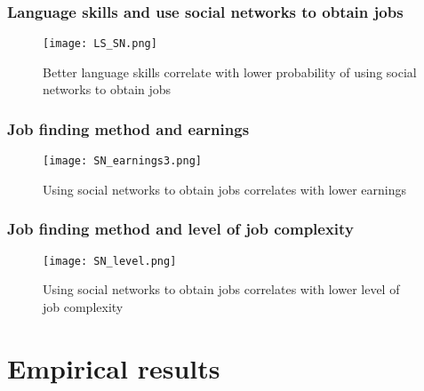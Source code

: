 \documentclass{beamer}
\begin{document}

\begin{frame}
\frametitle{Language skills and use social networks to obtain jobs}

\begin{figure}
\centering
\texttt{[image: LS\_SN.png]}
  \caption*{Better language skills correlate with lower probability of using social networks to obtain jobs}
\end{figure}

\end{frame}


\begin{frame}
\frametitle{Job finding method and earnings}

\begin{figure}
\centering
\texttt{[image: SN\_earnings3.png]}
  \caption*{Using social networks to obtain jobs correlates with lower earnings}
\end{figure}

\end{frame}


\begin{frame}
\frametitle{Job finding method and level of job complexity}

\begin{figure}
\centering
\texttt{[image: SN\_level.png]}
  \caption*{Using social networks to obtain jobs correlates with lower level of job complexity}
\end{figure}

\end{frame}
\section{Empirical results}
\end{document}
